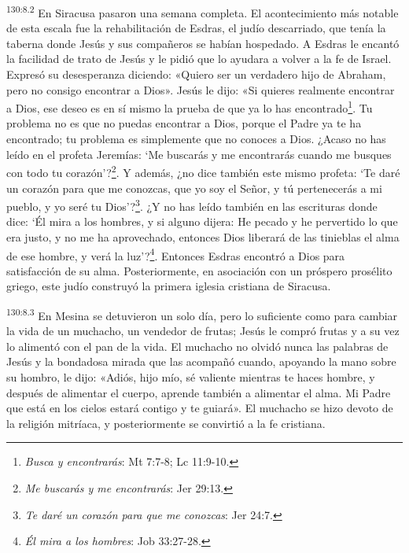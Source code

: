 \par
\textsuperscript{130:8.2} En Siracusa pasaron una semana completa. El acontecimiento más notable de esta escala fue la rehabilitación de Esdras, el judío descarriado, que tenía la taberna donde Jesús y sus compañeros se habían hospedado. A Esdras le encantó la facilidad de trato de Jesús y le pidió que lo ayudara a volver a la fe de Israel. Expresó su desesperanza diciendo: «Quiero ser un verdadero hijo de Abraham, pero no consigo encontrar a Dios». Jesús le dijo: «Si quieres realmente encontrar a Dios, ese deseo es en sí mismo la prueba de que ya lo has encontrado\footnote{\textit{Busca y encontrarás}: Mt 7:7-8; Lc 11:9-10.}. Tu problema no es que no puedas encontrar a Dios, porque el Padre ya te ha encontrado; tu problema es simplemente que no conoces a Dios. ¿Acaso no has leído en el profeta Jeremías: `Me buscarás y me encontrarás cuando me busques con todo tu corazón'?\footnote{\textit{Me buscarás y me encontrarás}: Jer 29:13.}. Y además, ¿no dice también este mismo profeta: `Te daré un corazón para que me conozcas, que yo soy el Señor, y tú pertenecerás a mi pueblo, y yo seré tu Dios'?\footnote{\textit{Te daré un corazón para que me conozcas}: Jer 24:7.}. ¿Y no has leído también en las escrituras donde dice: `Él mira a los hombres, y si alguno dijera: He pecado y he pervertido lo que era justo, y no me ha aprovechado, entonces Dios liberará de las tinieblas el alma de ese hombre, y verá la luz'?\footnote{\textit{Él mira a los hombres}: Job 33:27-28.}. Entonces Esdras encontró a Dios para satisfacción de su alma. Posteriormente, en asociación con un próspero prosélito griego, este judío construyó la primera iglesia cristiana de Siracusa.

\par
\textsuperscript{130:8.3} En Mesina se detuvieron un solo día, pero lo suficiente como para cambiar la vida de un muchacho, un vendedor de frutas; Jesús le compró frutas y a su vez lo alimentó con el pan de la vida. El muchacho no olvidó nunca las palabras de Jesús y la bondadosa mirada que las acompañó cuando, apoyando la mano sobre su hombro, le dijo: «Adiós, hijo mío, sé valiente mientras te haces hombre, y después de alimentar el cuerpo, aprende también a alimentar el alma. Mi Padre que está en los cielos estará contigo y te guiará». El muchacho se hizo devoto de la religión mitríaca, y posteriormente se convirtió a la fe cristiana.

